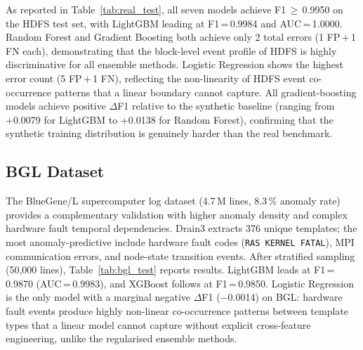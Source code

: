 \documentclass[5p, times]{elsarticle}
\begin{document}
As reported in Table~\ref{tab:real_test}, all seven models achieve F1\,$\geq$\,0.9950 on the HDFS test set, with LightGBM leading at F1\,=\,0.9984 and AUC\,=\,1.0000. Random Forest and Gradient Boosting both achieve only 2 total errors (1 FP\,+\,1 FN each), demonstrating that the block-level event profile of HDFS is highly discriminative for all ensemble methods. Logistic Regression shows
the highest error count (5 FP\,+\,1 FN), reflecting the non-linearity of HDFS event co-occurrence patterns that a linear boundary cannot capture. All gradient-boosting models achieve positive $\Delta$F1 relative to the synthetic baseline (ranging
from +0.0079 for LightGBM to +0.0138 for Random Forest), confirming that the synthetic training distribution is genuinely harder than the real benchmark.

\begin{table}[h!]
\centering
\caption{Performance results for HDFS data}
\label{tab:real_test}
\end{table}

\subsection{BGL Dataset}

The BlueGene/L supercomputer log dataset (4.7\,M lines, 8.3\,\% anomaly rate) provides a complementary validation with higher
anomaly density and complex hardware fault temporal dependencies. Drain3 extracts 376 unique templates; the most anomaly-predictive include hardware fault codes (\texttt{RAS KERNEL FATAL}), MPI communication errors, and node-state transition events. After stratified sampling (50{,}000 lines), Table~\ref{tab:bgl_test} reports results. LightGBM leads at F1\,=\,0.9870 (AUC\,=\,0.9983), and XGBoost follows at F1\,=\,0.9850. Logistic Regression is the only model with a marginal negative $\Delta$F1
($-$0.0014) on BGL: hardware fault events produce highly non-linear co-occurrence patterns between template types that a linear model cannot capture without explicit cross-feature engineering, unlike
the regularised ensemble methods.
\end{document}
